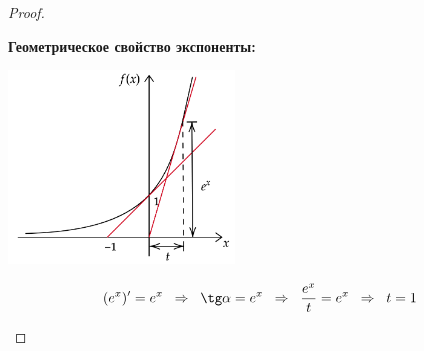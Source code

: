 \documentclass[12pt]{article} %
\theoremstyle{definition} %
\begin{document}
\begin{proof}
\begin{itemize}[label={$\bullet$}]
            \textbf{Геометрическое свойство экспоненты:}\par
            \begin{center}
               \includegraphics[width=6cm]{images/pic04_06.png}
            \end{center}
            \[
            (e^x)' = e^x \hspace{0.2cm} \Rightarrow \hspace{0.2cm} \tg \alpha = e^x \hspace{0.2cm} \Rightarrow  \hspace{0.2cm} \frac{e^x}{t} = e^x \hspace{0.2cm} \Rightarrow \hspace{0.2cm} t = 1
            \] \par


\end{itemize}
\end{proof}
\end{document}
